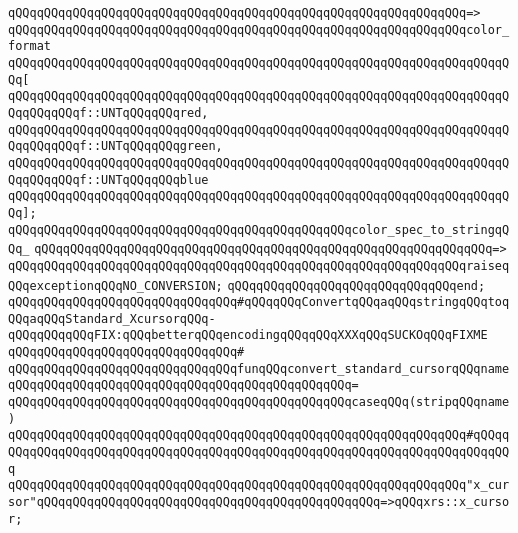 \verb|qQQqqQQqqQQqqQQqqQQqqQQqqQQqqQQqqQQqqQQqqQQqqQQqqQQqqQQqqQQqqQQq=>|\newline
\verb|qQQqqQQqqQQqqQQqqQQqqQQqqQQqqQQqqQQqqQQqqQQqqQQqqQQqqQQqqQQqqQQqcolor_format|\newline
\verb|qQQqqQQqqQQqqQQqqQQqqQQqqQQqqQQqqQQqqQQqqQQqqQQqqQQqqQQqqQQqqQQqqQQqqQQq[|\newline
\verb|qQQqqQQqqQQqqQQqqQQqqQQqqQQqqQQqqQQqqQQqqQQqqQQqqQQqqQQqqQQqqQQqqQQqqQQqqQQqqQQqf::UNTqQQqqQQqred,|\newline
\verb|qQQqqQQqqQQqqQQqqQQqqQQqqQQqqQQqqQQqqQQqqQQqqQQqqQQqqQQqqQQqqQQqqQQqqQQqqQQqqQQqf::UNTqQQqqQQqgreen,|\newline
\verb|qQQqqQQqqQQqqQQqqQQqqQQqqQQqqQQqqQQqqQQqqQQqqQQqqQQqqQQqqQQqqQQqqQQqqQQqqQQqqQQqf::UNTqQQqqQQqblue|\newline
\verb|qQQqqQQqqQQqqQQqqQQqqQQqqQQqqQQqqQQqqQQqqQQqqQQqqQQqqQQqqQQqqQQqqQQqqQQq];|\newline
\newline
\verb|qQQqqQQqqQQqqQQqqQQqqQQqqQQqqQQqqQQqqQQqqQQqqQQqcolor_spec_to_stringqQQq_|\newline
\verb|qQQqqQQqqQQqqQQqqQQqqQQqqQQqqQQqqQQqqQQqqQQqqQQqqQQqqQQqqQQqqQQq=>|\newline
\verb|qQQqqQQqqQQqqQQqqQQqqQQqqQQqqQQqqQQqqQQqqQQqqQQqqQQqqQQqqQQqqQQqraiseqQQqexceptionqQQqNO_CONVERSION;|\newline
\verb|qQQqqQQqqQQqqQQqqQQqqQQqqQQqqQQqend;|\newline
\newline
\verb|qQQqqQQqqQQqqQQqqQQqqQQqqQQqqQQq#qQQqqQQqConvertqQQqaqQQqstringqQQqtoqQQqaqQQqStandard_XcursorqQQq-qQQqqQQqqQQqFIX:qQQqbetterqQQqencodingqQQqqQQqXXXqQQqSUCKOqQQqFIXME|\newline
\verb|qQQqqQQqqQQqqQQqqQQqqQQqqQQqqQQq#|\newline
\verb|qQQqqQQqqQQqqQQqqQQqqQQqqQQqqQQqfunqQQqconvert_standard_cursorqQQqname|\newline
\verb|qQQqqQQqqQQqqQQqqQQqqQQqqQQqqQQqqQQqqQQqqQQqqQQq=|\newline
\verb|qQQqqQQqqQQqqQQqqQQqqQQqqQQqqQQqqQQqqQQqqQQqqQQqcaseqQQq(stripqQQqname)|\newline
\verb|qQQqqQQqqQQqqQQqqQQqqQQqqQQqqQQqqQQqqQQqqQQqqQQqqQQqqQQqqQQqqQQq#qQQqqQQqqQQqqQQqqQQqqQQqqQQqqQQqqQQqqQQqqQQqqQQqqQQqqQQqqQQqqQQqqQQqqQQqqQQq|\newline
\verb|qQQqqQQqqQQqqQQqqQQqqQQqqQQqqQQqqQQqqQQqqQQqqQQqqQQqqQQqqQQqqQQq"x_cursor"qQQqqQQqqQQqqQQqqQQqqQQqqQQqqQQqqQQqqQQqqQQqqQQq=>qQQqxrs::x_cursor;|\newline
